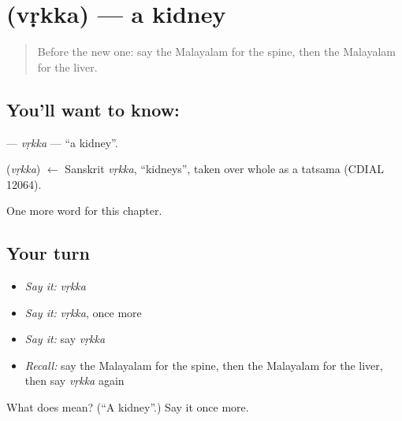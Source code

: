 \section[\texorpdfstring{\ml{വൃക്ക} (vṛkka)}{വൃക്ക (vṛkka)}]{ (vṛkka) — a kidney}

\label{lesson:ML-C235-vrkka}



\begin{quote}
Before the new one: say the Malayalam for the spine, then the Malayalam for the liver.
\end{quote}

\subsection*{You'll want to know: }
\textbf{} — \emph{vṛkka} — \textquotedblleft{}a kidney\textquotedblright{}.

\begin{cousinweb}
\textbf{} (\emph{vṛkka}) $\leftarrow$ Sanskrit \emph{vṛkka}, \textquotedblleft{}kidneys\textquotedblright{}, taken over whole as a tatsama (CDIAL 12064).
\end{cousinweb}

\begin{grammarlens}[title={What you've built}]
One more word for this chapter.
\end{grammarlens}

\subsection*{Your turn}
\begin{itemize}
\raggedright
  \item \emph{Say it:} \emph{vṛkka}
  \item \emph{Say it:} \emph{vṛkka}, once more
  \item \emph{Say it:} say \emph{vṛkka}
  \item \emph{Recall:} say the Malayalam for the spine, then the Malayalam for the liver, then say \emph{vṛkka} again
\end{itemize}

\begin{tcolorbox}[breakable,colback=teal!4,colframe=teal!35!black,title={Before you move on}]
What does  mean? (\textquotedblleft{}A kidney\textquotedblright{}.) Say it once more.
\end{tcolorbox}
